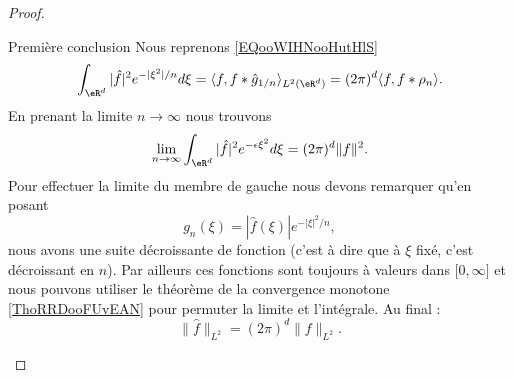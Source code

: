 \begin{proof}
\begin{subproof}
    \item[Première conclusion]
        Nous reprenons \eqref{EQooWIHNooHutHlS}
        \begin{equation}
            \int_{\eR^d}| \hat f |^2 e^{-| \xi^2 |/n}d\xi=\langle f, f*\hat g_{1/n}\rangle_{L^2(\eR^d)}=(2\pi)^d\langle f, f* \rho_n \rangle .
        \end{equation}
        En prenant la limite \( n\to \infty\) nous trouvons
        \begin{equation}
            \lim_{n\to \infty}\int_{\eR^d}| \hat f |^2 e^{-\epsilon\xi^2}d\xi=(2\pi)^d\| f \|^2.
        \end{equation}
        Pour effectuer la limite du membre de gauche nous devons remarquer qu'en posant
        \begin{equation}
            g_n(\xi)=| \hat f(\xi) | e^{-| \xi |^2/n},
        \end{equation}
        nous avons une suite décroissante de fonction (c'est à dire que à \( \xi\) fixé, c'est décroissant en \(n\)). Par ailleurs ces fonctions sont toujours à valeurs dans \( \mathopen[ 0 , \infty \mathclose]\) et nous pouvons utiliser le théorème de la convergence monotone \ref{ThoRRDooFUvEAN} pour permuter la limite et l'intégrale. Au final :
        \begin{equation}
            \| \hat f \|_{L^2}=(2\pi)^d\| f \|_{L^2}.
        \end{equation}
    \end{subproof}


\end{proof}
